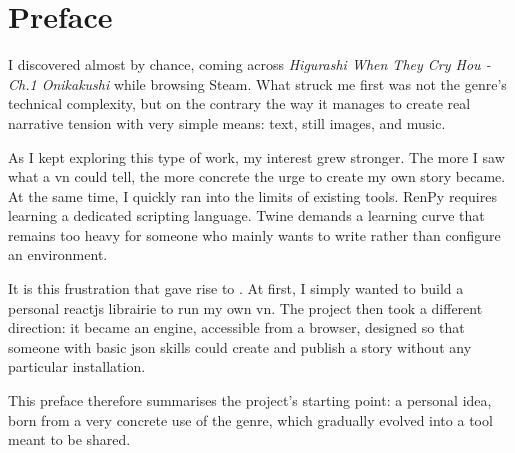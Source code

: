 \section*{Preface}

I discovered  almost by chance, coming across \textit{Higurashi When They Cry Hou - Ch.1 Onikakushi} while browsing Steam. What struck me first was not the genre's technical complexity, but on the contrary the way it manages to create real narrative tension with very simple means: text, still images, and music.

As I kept exploring this type of work, my interest grew stronger. The more I saw what a \acrlong{vn} could tell, the more concrete the urge to create my own story became. At the same time, I quickly ran into the limits of existing tools. RenPy requires learning a dedicated scripting language. Twine demands a learning curve that remains too heavy for someone who mainly wants to write rather than configure an environment.

It is this frustration that gave rise to \nsit. At first, I simply wanted to build a personal \gls{reactjs} \gls{librairie} to run my own \acrlong{vn}. The project then took a different direction: it became an  engine, accessible from a browser, designed so that someone with basic \acrshort{json} skills could create and publish a story without any particular installation.

This preface therefore summarises the project's starting point: a personal idea, born from a very concrete use of the genre, which gradually evolved into a tool meant to be shared.
